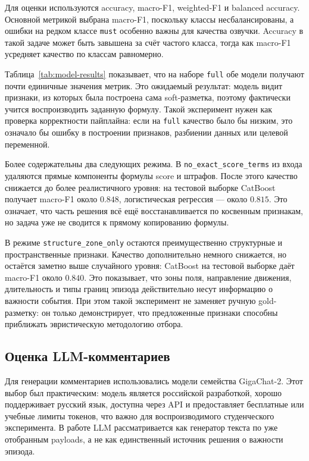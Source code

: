 \documentclass[a4paper,14pt]{extarticle}
\numberwithin{table}{section}
\numberwithin{figure}{section}
\numberwithin{equation}{section}
\begin{document}
Для оценки используются accuracy, macro-F1, weighted-F1 и balanced accuracy. Основной метрикой выбрана macro-F1, поскольку классы несбалансированы, а ошибки на редком классе \texttt{must} особенно важны для качества озвучки. Accuracy в такой задаче может быть завышена за счёт частого класса, тогда как macro-F1 усредняет качество по классам равномерно.



Таблица~\ref{tab:model-results} показывает, что на наборе \texttt{full} обе модели получают почти единичные значения метрик. Это ожидаемый результат: модель видит признаки, из которых была построена сама soft-разметка, поэтому фактически учится воспроизводить заданную формулу. Такой эксперимент нужен как проверка корректности пайплайна: если на \texttt{full} качество было бы низким, это означало бы ошибку в построении признаков, разбиении данных или целевой переменной.

Более содержательны два следующих режима. В \texttt{no\_exact\_score\_terms} из входа удаляются прямые компоненты формулы score и штрафов. После этого качество снижается до более реалистичного уровня: на тестовой выборке CatBoost получает macro-F1 около $0.848$, логистическая регрессия --- около $0.815$. Это означает, что часть решения всё ещё восстанавливается по косвенным признакам, но задача уже не сводится к прямому копированию формулы.

В режиме \texttt{structure\_zone\_only} остаются преимущественно структурные и пространственные признаки. Качество дополнительно немного снижается, но остаётся заметно выше случайного уровня: CatBoost на тестовой выборке даёт macro-F1 около $0.840$. Это показывает, что зоны поля, направление движения, длительность и типы границ эпизода действительно несут информацию о важности события. При этом такой эксперимент не заменяет ручную gold-разметку: он только демонстрирует, что предложенные признаки способны приближать эвристическую методологию отбора.

\subsection{Оценка LLM-комментариев}

Для генерации комментариев использовались модели семейства GigaChat-2. Этот выбор был практическим: модель является российской разработкой, хорошо поддерживает русский язык, доступна через API и предоставляет бесплатные или учебные лимиты токенов, что важно для воспроизводимого студенческого эксперимента. В работе LLM рассматривается как генератор текста по уже отобранным payloads, а не как единственный источник решения о важности эпизода.
\end{document}
